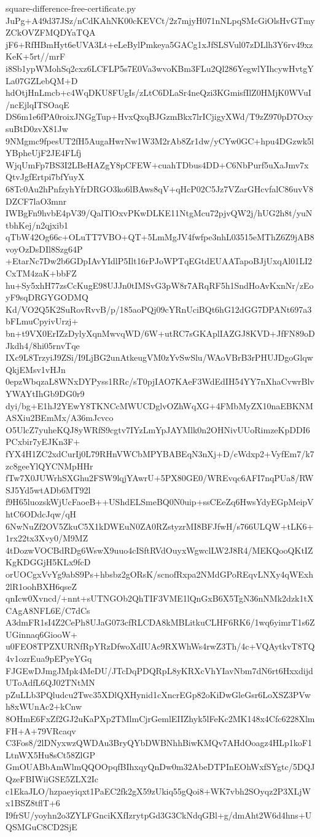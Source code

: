 \documentclass[11pt]{article}
\theoremstyle{definition}
\theoremstyle{remark}
\begin{document}
\begin{filecontents*}[overwrite]{square-difference-free-certificate.py}
JuPg+A49d37JSz/nCdKAhNK00cKEVCt/2z7mjyH071nNLpqSMcGiOlsHvGTmyZCkOVZFMQDYaTQA
jF6+RfHBmHyt6eUVA3Lt+eLeBylPmkeya5GACg1xJfSLSVul07zDLlh3Y6rv49xzKeK+5rt//mrF
i8Sb1ypWMohSq2cxz6LCFLP5s7E0Va3wvoKBm3FLu2Ql286YegwlYIhcywHvtgYLa07GZLebQM+D
hdOtjHnLmcb+c4WqDKU8FUgIs/zLtC6DLaSr4neQzi3KGmisfIlZ0HMjK0WVuI/ncEjlqITSOaqE
DS6m1e6fPA0roixJNGgTup+HvxQxqBJGzmBkx7lrICjigyXWd/T9zZ970pD7OxysuBtD0zvX81Jw
9NMgmc9fpesUT2fH5AugaHwrNw1W3M2rAb8Zr1dw/yCYw0GC+hpu4DGzwk5lYBpheUjF2JE4FLfj
WjqUmFp7BS3I2LBeHAZgY8pCFEW+cuahTDbus4DD+C6NbPurf5uXaJmv7xQtvJgfErtpi7bfYuyX
68Tc0Au2hPnfzyhYfrDRGO3ko6lBAws8qV+qHcP02C5Jz7VZarGHcvfalC86uvV8DZCF7laO3mnr
IWBgFn9hvbE4pV39/QalTlOxvPKwDLKE11NtgMcu72pjvQW2j/hUG2h8t/yuNtbhKej/n2qjxib1
qTbW42Og66c+OLuTT7VBO+QT+5LmMgJV4fwfpe3nhL03515eMThZ6Z9jAB8voyOzDsDIl8Szg64P
+EtarNc7Dw2b6GDpIAvYIdlP5Ilt16rPJoWPTqEGtdEUAATapoBJjUxqAl01LI2CxTM4zaK+bbFZ
hu+Sy5xhH77zsCcKugE98UJJn0tIMSvG3pW8r7ARqRF5h1SndHoAvKxnNr/zEoyF9sqDRGYGODMQ
Kd/VO2Q5K2SuRovRvvB/p/185aoPQj09cYRnUciBQt6hG12dGG7DPANt697a3bFLmuCpyivUrzj+
bn+t9VX0ErIZzDylyXqnMwvqWD/6W+utRC7sGKAplIAZGJ8KVD+JfFN89oDJkdh4/8hi05rnvTqe
IXc9L8TrzyiJ9ZSi/I9LjBG2unAtkeugVM0zYvSwSlu/WAoVBrB3rPHUJDgoGlqwQkjEMsv1vHJn
0epzWbqzaL8WNxDYPyss1RRc/sT0pjIAO7KAeF3WdEdIH54YY7nXhaCvwrBlvYWAYtIhGb9DG0r9
dyi/bg+E1hJ2YEwY8TKNCcMWUCDglvOZhWqXG+4FMbMyZX10naEBKNMASXiu2BEmMx/A36mJcvco
O5UlcZ7yuheKQJ8yWRfS9cgtv7IYzLmYpJAYMlk0n2OHNivUUoRimzeKpDDI6PCxbir7yEJKn3F+
fYX4H1ZC2xdCurIj0L79RHnVWCbMPYBABEqN3nXj+D/cWdxp2+VyfEm7/k7zc8geeYlQYCNMpHHr
fTw7X0JUWrhSXGhu2FSW9lqjYAwrU+5PX80GE0/WREvqc6AFI7nqPUa8/RWSJ5Yd5wtADb6MT92l
f9H65luozskWjUcFaoeB++UShdELSmeBQ0N0uip+ssCEeZq6HwsYdyEGpMeipVhtC6ODdcJqw/qH
6NwNuZf2OV5ZkuC5X1kDWEuN0ZA0RZstyzrMI8BFJfwH/s766ULQW+tLK6+1rx22tx3Xvy0/M9MZ
4tDozwVOCBdRDg6WswX9uuo4cISftRVdOuyxWgwclLW2J8R4/MEKQooQKtIZKgKDGGjH5KLx9fcD
orUOCgxVvYg9abS9Ps+hbsbz2gORsK/scnofRxpa2NMdGPoREqvLNXy4qWExh2lR1oohBXH6qseZ
qnIcw0Xvncd/+nnt+sUTNGOb2QhTIF3VME1lQnGxB6X5TgN36nNMk2dzk1tXCAgA8NFL6E/C7dCs
A3dmFR1sI4Z2CePh8UJaG073cfRLCDA8kMBLitkuCLHF6RK6/1wq6yimrT1s6ZUGinnaq6GiooW+
u0FEO8TPZXURNfRpYRzDfwoXdIUAc9RXWhWs4rwZ3Th/4c+VQAytkvT8TQ4v1ozrEua9pEPyeYGq
FJGEwDJmgJMpk4MeDU/JTcDqPDQRpL8yKRXcVhYIavNbm7dN6rt6HxxdijdUToAdfL6QJ02TNtMN
pZuLLb3PQludcu2Twc35XDlQXHynid1cXncrEGp82oKiDwGleGsr6LoXSZ3PVwh8xWUnAc2+kCnw
8OHmE6FxZf2GJ2uKaPXp2TMlmCjrGemlEIIZhyk5lFeKc2MK148x4Cfc6228XlmFH+A+79VRcaqv
C3Fos8/2lDNyxwzQWDAu3BryQYbDWBNhhBiwKMQv7AHdOoagz4HLp1koF1LtnWX5Hu8sCt58ZlGP
GmOUABbAmWlmQQOOpqfBIhxqyQnDw0m32AbeDTPInEOhWxfSYgtc/5DQJQzeFBIWiiGSE5ZLX2Ic
c1EkaJLO/hzpaeyiqxt1PaEC2fk2gX59zUkiq55gQoi8+WK7vbh2SOyqz2P3XLjWx1BSZ8tflT+6
I9frSU/yoyhn2o3ZYLFGnciKXfIzrytpGd3G3CkNdqGBl+g/dmAht2W6d4hns+UQSMGuC8CD2SjE

\end{filecontents*}
\end{document}
